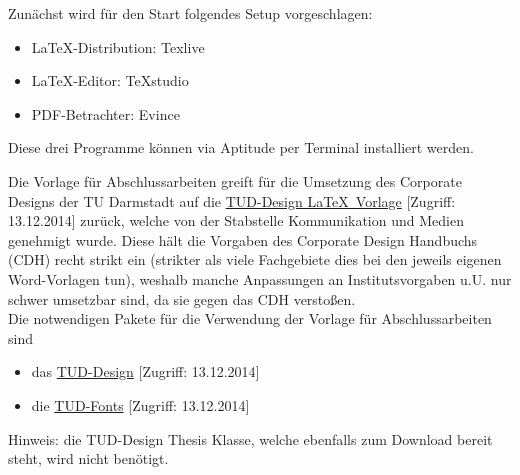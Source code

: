 Zunächst wird für den Start folgendes Setup vorgeschlagen:
\begin{itemize}
	\item \LaTeX-Distribution: Texlive
	\item \LaTeX-Editor: TeXstudio
	\item PDF-Betrachter: Evince
\end{itemize}
Diese drei Programme können via Aptitude per Terminal installiert werden.

Die Vorlage für Abschlussarbeiten greift für die Umsetzung des Corporate Designs der TU Darmstadt auf die \href{http://exp1.fkp.physik.tu-darmstadt.de/tuddesign/}{TUD-Design \LaTeX\ Vorlage} [Zugriff: 13.12.2014] zurück, welche von der Stabstelle Kommunikation und Medien genehmigt wurde. Diese hält die Vorgaben des Corporate Design Handbuchs (CDH) recht strikt ein (strikter als viele Fachgebiete dies bei den jeweils eigenen Word-Vorlagen tun), weshalb manche Anpassungen an Institutsvorgaben u.U. nur schwer umsetzbar sind, da sie gegen das CDH verstoßen.\\
Die notwendigen Pakete für die Verwendung der Vorlage für Abschlussarbeiten sind
\begin{itemize}
	\item das \href{http://exp1.fkp.physik.tu-darmstadt.de/tuddesign/latex/latex-tuddesign/latex-tuddesign_0.0.20100410.zip}{TUD-Design} [Zugriff: 13.12.2014]
	\item die \href{http://exp1.fkp.physik.tu-darmstadt.de/tuddesign/latex/tudfonts-tex/tudfonts-tex_0.0.20090806.zip}{TUD-Fonts} [Zugriff: 13.12.2014]
\end{itemize}
Hinweis: die TUD-Design Thesis Klasse, welche ebenfalls zum Download bereit steht, wird nicht benötigt.

